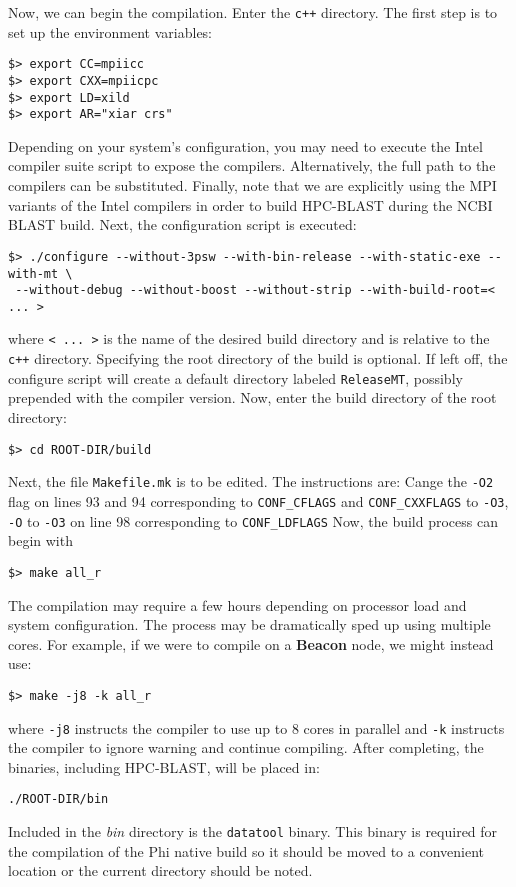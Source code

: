 \documentclass[10pt]{article}
\newcommand{\beac}{\textbf{Beacon }}
\begin{document}
\noindent Now, we can begin the compilation.  Enter the  \verb^c++^ directory.  The first step is to set up the environment variables:
\begin{verbatim}
$> export CC=mpiicc
$> export CXX=mpiicpc
$> export LD=xild
$> export AR="xiar crs" 
\end{verbatim}
\noindent Depending on your system's configuration, you may need to execute the Intel compiler suite script to expose the compilers.  Alternatively, the full path to the compilers can be substituted.  Finally, note that we are explicitly using the MPI variants
of the Intel compilers in order to build HPC-BLAST during the NCBI BLAST build.  Next, the configuration script is executed:
\begin{verbatim}
$> ./configure --without-3psw --with-bin-release --with-static-exe --with-mt \
 --without-debug --without-boost --without-strip --with-build-root=< ... >
\end{verbatim}
\noindent where \verb^< ... >^ is the name of the desired build directory and is relative to the \verb^c++^ directory.  Specifying the root directory of the build is optional.  If left off, the configure script will create a default directory labeled \verb^ReleaseMT^, possibly
prepended with the compiler version.  Now, enter the build directory of the root directory:
\begin{verbatim}
$> cd ROOT-DIR/build
\end{verbatim}
\noindent Next, the file \verb^Makefile.mk^ is to be edited. The instructions are:
Cange the \verb^-O2^ flag on lines 93 and 94 corresponding to \verb^CONF_CFLAGS^ and \verb^CONF_CXXFLAGS^ to \verb^-O3^, \verb^-O^ to \verb^-O3^ on line 98 corresponding
to \verb^CONF_LDFLAGS^
\noindent Now, the build process can begin with
\begin{verbatim}
$> make all_r
\end{verbatim}
\noindent The compilation may require a few hours depending on processor load and system configuration.  The process may be dramatically sped up using multiple cores.  For example, if we were to compile on a \beac node, we might instead use:
\begin{verbatim}
$> make -j8 -k all_r 
\end{verbatim}
\noindent where \verb^-j8^ instructs the compiler to use up to 8 cores in parallel and \verb^-k^ instructs the compiler to ignore warning and continue compiling.  After completing, the binaries, including HPC-BLAST, will be placed in:
\begin{verbatim}
./ROOT-DIR/bin
\end{verbatim}
\noindent Included in the \emph{bin} directory is the \verb^datatool^ binary.  This binary is required for the compilation of the Phi native build so it should be moved to a convenient location or the current directory should be noted.
\end{document}

